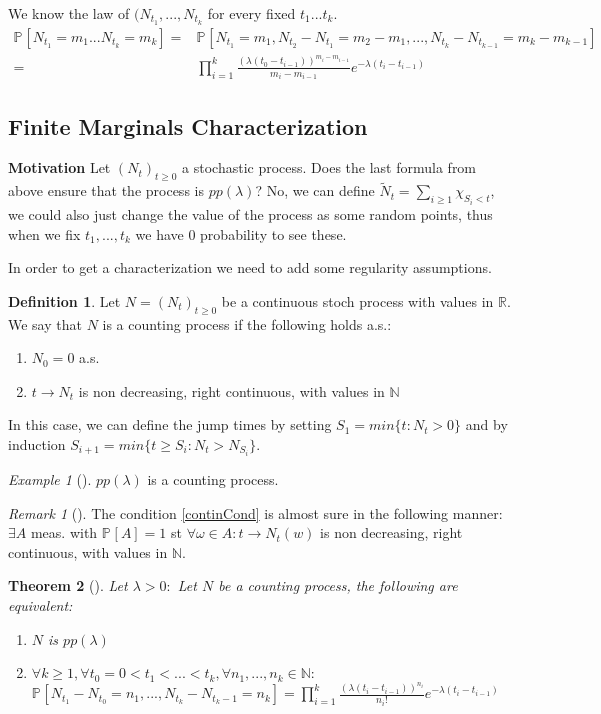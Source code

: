 \documentclass[12pt]{book}
\newtheorem{theorem}{Theorem}[section]
\theoremstyle{definition}
\newtheorem{defn}{Definition}[section]
\theoremstyle{remark}
\newtheorem{ex}{Example}[section]
\newtheorem{rmk}[theorem]{Remark}
\begin{document}
We know the law of $(N_{t_1},...,N_{t_k}$ for every fixed $t_1...t_k$. 
\begin{align}
	\mathbb{P}_{} \left[ N_{t_1}=m_1...N_{t_k}=m_k \right] =& \mathbb{P}_{} \left[ N_{t_1}=m_1, N_{t_2}-N_{t_1}=m_2 - m_1,..., N_{t_k}-N_{t_{k-1}}=m_k - m_{k-1} \right] \nonumber \\ 
	=& \prod_{i=1}^{k}\frac{(\lambda (t_0 - t_{i-1}))^{m_i-m_{i-1}}}{m_i - m_{i-1}} e^{- \lambda (t_i - t_{i-1})}
\end{align}

\subsection{Finite Marginals Characterization}
\textbf{Motivation}  Let $(N_t)_{t\geq 0}$ a stochastic process. Does the last formula from above ensure that the process is $pp(\lambda)$? No, we can define $\tilde{N}_t =  \sum_{i \geq 1}^{} \chi_{S_i<t} $, we could also just change the value of the process as some random points, thus when we fix $t_1,...,t_k$ we have 0 probability to see these.

In order to get a characterization we need to add some regularity assumptions.

\begin{defn}
	Let $N=(N_t)_{t \geq 0}$ be a continuous stoch process with values in $\mathbb{R}$. We say that $N$ is a counting process if the following holds a.s.:
\begin{enumerate}
	\item $N_0 = 0$ a.s.
	\item  $t \to N_t$ is non decreasing, right continuous, with values in $\mathbb{N}$ \label{continCond}
\end{enumerate}
In this case, we can define the jump times by setting $S_1=min\{t: N_t >0\}$ and by induction  $S_{i+1}= min\{t \geq S_i: N_t > N_{S_i}\}$.
\end{defn}

\begin{ex}[]
	$pp(\lambda )$ is a counting process.
\end{ex}

\begin{rmk}[]
	The condition \ref{continCond} is almost sure in the following manner: $\exists A$ meas. with $\mathbb{P}_{} \left[ A \right] =1$ st $\forall \omega \in A: t \to N_t(w)$ is non decreasing, right continuous, with values in $\mathbb{N}$.
\end{rmk}

\begin{theorem}[]
	Let $\lambda> 0:$ Let $N$ be a counting process, the following are equivalent:
\begin{enumerate}
	\item $N$ is $pp(\lambda)$
	\item $\forall k \geq 1, \forall t_0 =0 < t_1 <...<t_k, \forall n_1,...,n_k \in \mathbb{N}:$ \\ $\mathbb{P}_{} \left[ N_{t_1}-N_{t_0}=n_1,...,N_{t_k}-N_{t_k-1}=n_k \right] = \prod_{i=1}^k \frac{(\lambda (t_i - t_{i-1}))^{n_i}}{n_i!} e^{-\lambda (t_i - t_{i-1})} $
\end{enumerate}

\end{theorem}
\end{document}
